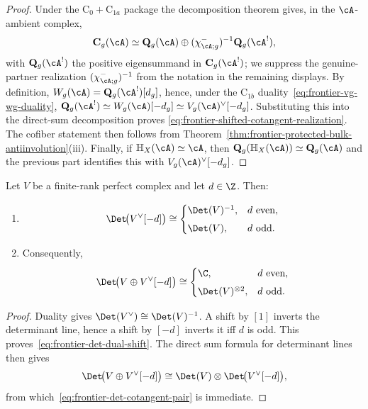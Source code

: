 \begin{proof}
Under the $\mathrm C_0+\mathrm C_{1a}$ package the decomposition
theorem gives, in the $\cA$-ambient complex,
\[
\mathbf C_g(\cA)
\simeq
\mathbf Q_g(\cA)\oplus (\chi^-_{\cA;g})^{-1}\mathbf Q_g(\cA^!),
\]
with $\mathbf Q_g(\cA^!)$ the positive eigensummand in
$\mathbf C_g(\cA^!)$; we suppress the genuine-partner realization
$(\chi^-_{\cA;g})^{-1}$ from the notation in the remaining displays.
By definition,
$W_g(\cA)=\mathbf Q_g(\cA^!)[d_g]$, hence, under the $\mathrm C_{1b}$
duality~\eqref{eq:frontier-vg-wg-duality},
$\mathbf Q_g(\cA^!)\simeq W_g(\cA)[-d_g]\simeq V_g(\cA)^\vee[-d_g]$.
Substituting this into the direct-sum decomposition proves
\eqref{eq:frontier-shifted-cotangent-realization}. The cofiber statement then
follows from Theorem~\ref{thm:frontier-protected-bulk-antiinvolution}(iii).
Finally, if $\mathbb H_X(\cA)\simeq \cA$, then
$\mathbf Q_g(\mathbb H_X(\cA))\simeq \mathbf Q_g(\cA)$ and the previous part
identifies this with $V_g(\cA)^\vee[-d_g]$.
\end{proof}

\begin{lemma}
\label{lem:frontier-determinant-parity}
Let $V$ be a finite-rank perfect complex and let $d\in\Z$.
Then:
\begin{enumerate}[label=\textup{(\alph*)}]
\item
 \begin{equation}\label{eq:frontier-det-dual-shift}
 \Det\!\bigl(V^\vee[-d]\bigr)
 \cong
 \begin{cases}
 \Det(V)^{-1}, & d\ \text{even},\\[4pt]
 \Det(V), & d\ \text{odd}.
 \end{cases}
 \end{equation}
\item Consequently,
 \begin{equation}\label{eq:frontier-det-cotangent-pair}
 \Det\!\bigl(V\oplus V^\vee[-d]\bigr)
 \cong
 \begin{cases}
 \C, & d\ \text{even},\\[4pt]
 \Det(V)^{\otimes 2}, & d\ \text{odd}.
 \end{cases}
 \end{equation}
\end{enumerate}
\end{lemma}

\begin{proof}
Duality gives $\Det(V^\vee)\cong \Det(V)^{-1}$.
A shift by $[1]$ inverts the determinant line, hence a shift by $[-d]$ inverts
it iff $d$ is odd. This proves~\eqref{eq:frontier-det-dual-shift}. The direct
sum formula for determinant lines then gives
\[
\Det\!\bigl(V\oplus V^\vee[-d]\bigr)
\cong
\Det(V)\otimes \Det\!\bigl(V^\vee[-d]\bigr),
\]
from which~\eqref{eq:frontier-det-cotangent-pair} is immediate.
\end{proof}

